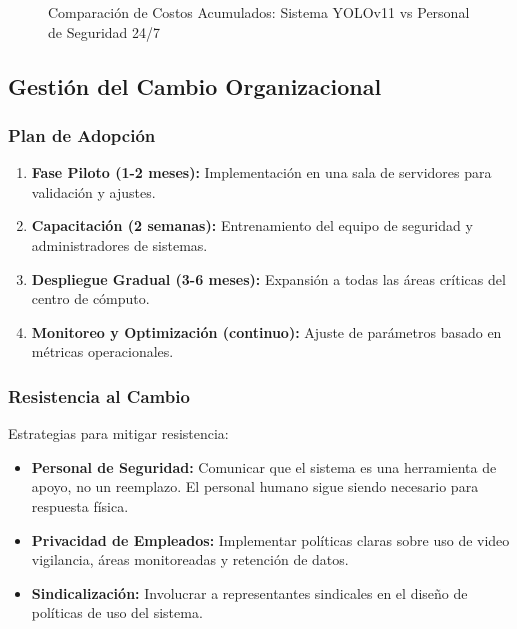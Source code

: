 \documentclass[12pt, a4paper]{article}
\begin{document}
\begin{itemize}
\begin{figure}[H]
\caption{Comparación de Costos Acumulados: Sistema YOLOv11 vs Personal de Seguridad 24/7}
\label{fig:roi-comparison}
\end{figure}

\subsection{Gestión del Cambio Organizacional}

\subsubsection{Plan de Adopción}
\begin{enumerate}
\item \textbf{Fase Piloto (1-2 meses):} Implementación en una sala de servidores para validación y ajustes.
\item \textbf{Capacitación (2 semanas):} Entrenamiento del equipo de seguridad y administradores de sistemas.
\item \textbf{Despliegue Gradual (3-6 meses):} Expansión a todas las áreas críticas del centro de cómputo.
\item \textbf{Monitoreo y Optimización (continuo):} Ajuste de parámetros basado en métricas operacionales.
\end{enumerate}

\subsubsection{Resistencia al Cambio}
Estrategias para mitigar resistencia:
\begin{itemize}
\item \textbf{Personal de Seguridad:} Comunicar que el sistema es una herramienta de apoyo, no un reemplazo. El personal humano sigue siendo necesario para respuesta física.
\item \textbf{Privacidad de Empleados:} Implementar políticas claras sobre uso de video vigilancia, áreas monitoreadas y retención de datos.
\item \textbf{Sindicalización:} Involucrar a representantes sindicales en el diseño de políticas de uso del sistema.
\end{itemize}


\end{itemize}
\end{document}
